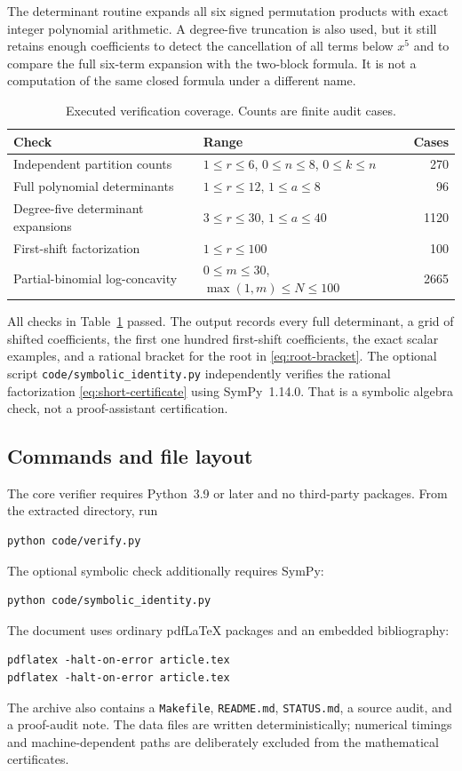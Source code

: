 \documentclass[11pt,a4paper]{article}
\theoremstyle{definition}
\numberwithin{equation}{section}
\begin{document}
The determinant routine expands all six signed permutation products
with exact integer polynomial arithmetic. A degree-five truncation is
also used, but it still retains enough coefficients to detect the
cancellation of all terms below $x^5$ and to compare the full six-term
expansion with the two-block formula. It is not a computation of the
same closed formula under a different name.

\begin{table}[ht]
\centering
\caption{Executed verification coverage. Counts are finite audit cases.}
\label{tab:checks}
\small
\begin{tabular}{@{}p{5.1cm}p{6.7cm}r@{}}
\toprule
Check & Range & Cases\\
\midrule
Independent partition counts & $1\le r\le6$, $0\le n\le8$, $0\le k\le n$ &270\\
Full polynomial determinants & $1\le r\le12$, $1\le a\le8$ &96\\
Degree-five determinant expansions & $3\le r\le30$, $1\le a\le40$ &1120\\
First-shift factorization & $1\le r\le100$ &100\\
Partial-binomial log-concavity & $0\le m\le30$, $\max(1,m)\le N\le100$ &2665\\
\bottomrule
\end{tabular}
\end{table}

All checks in Table~\ref{tab:checks} passed. The output records every full
determinant, a grid of shifted coefficients, the first one hundred
first-shift coefficients, the exact scalar examples, and a rational
bracket for the root in \eqref{eq:root-bracket}. The optional script
\texttt{code/symbolic\_identity.py} independently verifies the rational
factorization \eqref{eq:short-certificate} using SymPy~1.14.0. That is a
symbolic algebra check, not a proof-assistant certification.

\subsection{Commands and file layout}

The core verifier requires Python~3.9 or later and no third-party
packages. From the extracted directory, run
\begin{lstlisting}
python code/verify.py
\end{lstlisting}
The optional symbolic check additionally requires SymPy:
\begin{lstlisting}
python code/symbolic_identity.py
\end{lstlisting}
The document uses ordinary pdfLaTeX packages and an embedded bibliography:
\begin{lstlisting}
pdflatex -halt-on-error article.tex
pdflatex -halt-on-error article.tex
\end{lstlisting}
The archive also contains a \texttt{Makefile}, \texttt{README.md},
\texttt{STATUS.md}, a source audit, and a proof-audit note. The data files
are written deterministically; numerical timings and machine-dependent
paths are deliberately excluded from the mathematical certificates.
\end{document}
